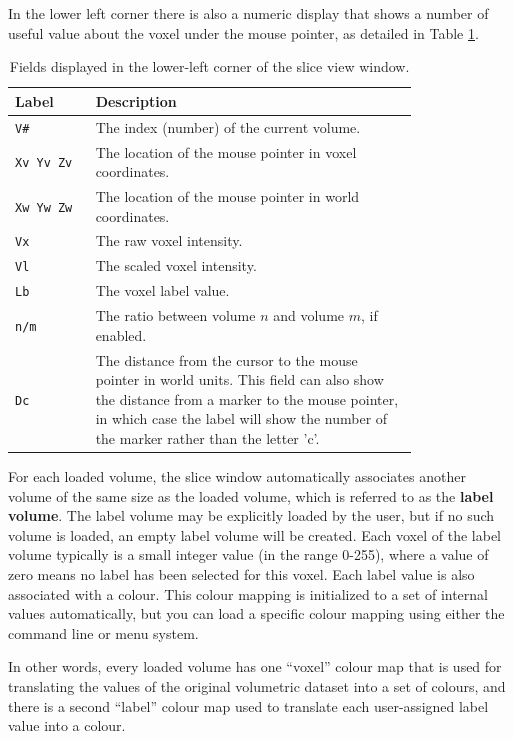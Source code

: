 \documentclass[11pt,letterpaper]{article}
\newcommand{\ident}[1]{{\tt #1}}
\begin{document}
In the lower left corner there is also a numeric display that shows a
number of useful value about the voxel under the mouse pointer, as
detailed in Table \ref{tabSliceFields}.
\begin{table}
\centering
\caption{Fields displayed in the lower-left corner of the slice view window.}
\begin{tabular}{lp{0.8\linewidth}}
Label & Description \\
\hline
\ident{V\#} & The index (number) of the current volume. \\
\ident{Xv Yv Zv} & The location of the mouse pointer in voxel coordinates. \\
\ident{Xw Yw Zw} & The location of the mouse pointer in world coordinates. \\
\ident{Vx} & The raw voxel intensity. \\
\ident{Vl} & The scaled voxel intensity. \\
\ident{Lb} & The voxel label value. \\
\ident{n/m} & The ratio between volume $n$ and volume $m$, if enabled. \\
\ident{Dc} & The distance from the cursor to the mouse pointer in world units. This field can also show the distance from a marker to the mouse pointer, in which case the label will show the number of the marker rather than the letter 'c'. \\
\hline
\end{tabular}
\label{tabSliceFields}
\end{table}

For each loaded volume, the slice window automatically associates
another volume of the same size as the loaded volume, which is
referred to as the {\bf label volume}. The label volume may be
explicitly loaded by the user, but if no such volume is loaded, an
empty label volume will be created. Each voxel of the label volume
typically is a small integer value (in the range 0-255), where a value
of zero means no label has been selected for this voxel. Each label
value is also associated with a colour. This colour mapping is
initialized to a set of internal values automatically, but you can
load a specific colour mapping using either the command line or menu
system.

In other words, every loaded volume has one ``voxel'' colour map that
is used for translating the values of the original volumetric dataset
into a set of colours, and there is a second ``label'' colour map used
to translate each user-assigned label value into a colour.
\end{document}
